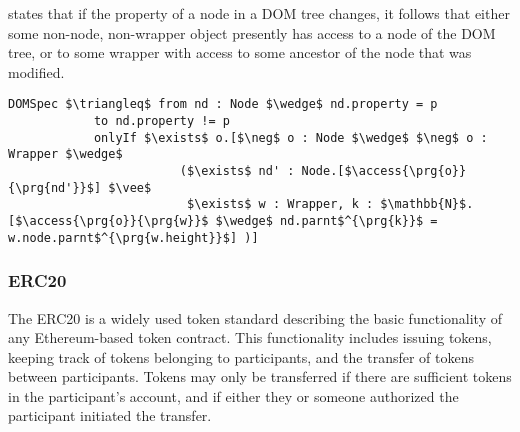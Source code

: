  states that if the property of a node in a DOM tree changes,
it follows that either some non-node, non-wrapper object presently has 
access to a node of the DOM tree, or to some wrapper with access to some 
ancestor of the node that was modified.
\begin{lstlisting}[language = Chainmail, mathescape=true, frame=lines]
DOMSpec $\triangleq$ from nd : Node $\wedge$ nd.property = p
            to nd.property != p
            onlyIf $\exists$ o.[$\neg$ o : Node $\wedge$ $\neg$ o : Wrapper $\wedge$ 
                        ($\exists$ nd' : Node.[$\access{\prg{o}}{\prg{nd'}}$] $\vee$ 
                         $\exists$ w : Wrapper, k : $\mathbb{N}$.[$\access{\prg{o}}{\prg{w}}$ $\wedge$ nd.parnt$^{\prg{k}}$ = w.node.parnt$^{\prg{w.height}}$] )]
\end{lstlisting}

\subsubsection{ERC20}
The ERC20\cite{ERC20} is a widely used token standard describing the basic functionality of any Ethereum-based token 
contract. This functionality includes issuing tokens, keeping track of tokens belonging to participants, and the 
transfer of tokens between participants. Tokens may only be transferred if there are sufficient tokens in the 
participant's account, and if either they or someone authorized the participant initiated the transfer. 

